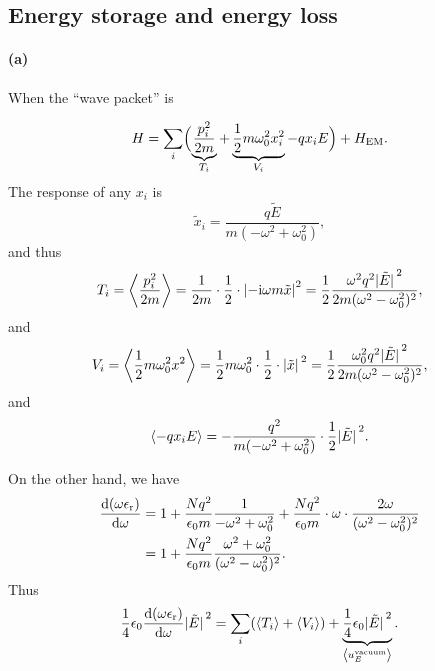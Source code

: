 \documentclass[hyperref, a4paper]{article}
\newcommand*{\ii}{\mathrm{i}}
\newcommand{\epsr}{\epsilon_{\text{r}}}
\begin{document}
\subsection{Energy storage and energy loss}

\paragraph{(a)} When the ``wave packet'' is 

\begin{equation}
    H = \sum_i \Bigl(
        \underbrace{
            \frac{p_i^2}{2m}
        }_{T_i} 
        + \underbrace{
            \frac{1}{2} m \omega_0^2 x_i^2
        }_{V_i} 
        - q x_i E
    \Bigr) + H_{\text{EM}}.
\end{equation}
The response of any $x_i$ is 
\begin{equation}
    \tilde{x}_i = \frac{q \tilde{E}}{m(- \omega^2 + \omega_0^2)},
\end{equation}
and thus 
\begin{equation}
    T_i = \expval{\frac{p_i^2}{2m}}
    = \frac{1}{2m} \cdot \frac{1}{2} \cdot  \abs{- \ii \omega m \tilde{x}}^2 
    = \frac{1}{2} \frac{\omega^2 q^2 \abs*{\tilde{E}}^2}{
        2 m (\omega^2 - \omega_0^2)^2
    },
\end{equation}
and 
\begin{equation}
    V_i = \expval{\frac{1}{2} m \omega_0^2 x^2}
    = \frac{1}{2} m \omega_0^2 \cdot \frac{1}{2} \cdot \abs*{\tilde{x}}^2 
    = \frac{1}{2} \frac{\omega_0^2 q^2 \abs*{\tilde{E}}^2}{
        2 m (\omega^2 - \omega_0^2)^2
    },
\end{equation}
and 
\begin{equation}
    \expval{- q x_i E} = - \frac{q^2}{m (- \omega^2 + \omega_0^2)} \cdot \frac{1}{2} \abs*{\tilde{E}}^2.
\end{equation}

On the other hand, we have 
\begin{equation}
    \begin{aligned}
        \dv{(\omega \epsr)}{\omega} &= 
        1 + \frac{N q^2}{\epsilon_0 m} \frac{1}{- \omega^2 + \omega_0^2}
        + \frac{N q^2}{\epsilon_0 m} \cdot \omega \cdot \frac{2 \omega}{(\omega^2 - \omega_0^2)^2} \\ 
        &= 1 + \frac{Nq^2}{\epsilon_0 m} \frac{
            \omega^2 + \omega_0^2
        }{(\omega^2 - \omega_0^2)^2}. 
    \end{aligned}
\end{equation}
Thus 
\begin{equation}
    \frac{1}{4} \epsilon_0 \dv{(\omega \epsr)}{\omega} \abs*{\tilde{E}}^2 
    = \sum_i (\expval{T_i} + \expval{V_i}) + \underbrace{
        \frac{1}{4} \epsilon_0 \abs*{\tilde{E}}^2
    }_{\expval{u_E^{\text{vacuum}}}} .
\end{equation}
\end{document}
